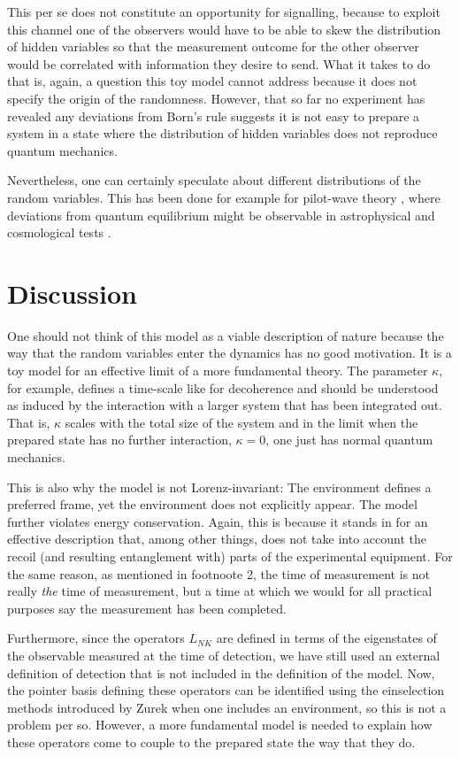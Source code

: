 \documentclass[11pt,twoside,A4]{article}
\begin{document}
This per se does not constitute an opportunity for signalling, because to exploit this channel one of the observers would have to be able to skew the distribution of hidden variables so that the measurement outcome for the other observer would be correlated with information they desire to send. What it takes to do that is, again, a question this toy model cannot address because it does not specify the origin of the randomness. However,  that so far no experiment has revealed any deviations from Born's rule suggests it is not easy to prepare a system in a state where the distribution of hidden variables does not reproduce quantum mechanics. 

Nevertheless, one can certainly speculate about different distributions of the random variables. This has been done for example for pilot-wave theory \cite{Val1,Val2,Val3}, where deviations from quantum equilibrium might be observable in astrophysical
and cosmological tests \cite{Val4,Val5}.

\section{Discussion}


One should not think of this model as a viable description of nature because the way that the random variables enter the dynamics has no good motivation. It is a toy model for an effective limit of a more fundamental theory. The parameter $\kappa$, for example, defines a time-scale like for decoherence and should be understood as induced by the interaction with a larger system that has been integrated out. That is, $\kappa$ scales with the total size of the system and in the limit when the prepared state has no further interaction, $\kappa = 0$, one just has normal quantum mechanics. 


This is also why the model is not Lorenz-invariant: The environment defines a preferred frame, yet the environment does not explicitly appear. The model further violates energy conservation. Again, this is because it stands in for an effective description that, among other things, does not take into account the recoil (and resulting entanglement with) parts of the experimental equipment. For the same reason, as mentioned in footnoote 2, the time of measurement is not really {\emph{the}} time of measurement, but a time at which we would for all practical purposes say the measurement has been completed. 

Furthermore, since the operators $L_{NK}$ are defined in terms of the eigenstates of the observable measured at the time of detection, we have still used an external definition of detection that is not included in the definition of the model. Now, the pointer basis defining these operators can be identified using the einselection methods introduced by Zurek \cite{Zurek} when one includes an environment, so this is not a problem per so. However, a more fundamental model is needed to explain how these operators come to couple to the prepared state the way that they do. 
\end{document}
